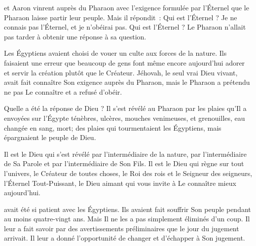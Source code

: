  et Aaron vinrent auprès du Pharaon
 avec l'exigence formulée par l'Éternel que le Pharaon
 laisse partir leur peuple.
 Mais il répondit~: \og Qui est l'Éternel ? Je ne connais pas l'Éternel,
 et je n'obéirai pas. \fg{}
 Qui est l'Éternel ? Le Pharaon n'allait pas tarder
 à obtenir une réponse à sa question.

Les Égyptiens avaient choisi de vouer un culte aux forces de la nature.
 Ils faisaient une erreur que beaucoup de gens font même encore aujourd'hui
 \ocadr{}adorer et servir la création plutôt que le Créateur.
 Jéhovah, le seul vrai Dieu vivant, avait fait connaître Son exigence
 auprès du Pharaon, mais le Pharaon a prétendu
 ne pas Le connaître et a refusé d'obéir.

Quelle a été la réponse de Dieu ? Il s'est révélé au Pharaon
 par les plaies qu'Il a envoyées sur l'Égypte
 \ocadr{}ténèbres, ulcères, mouches venimeuses, et grenouilles,
 eau changée en sang, mort; des plaies qui tourmentaient les Égyptiens,
 mais épargnaient le peuple de Dieu.


Il est le Dieu qui s'est révélé par l'intermédiaire de la nature,
 par l'intermédiaire de Sa Parole et par l'intermédiaire de Son Fils.
 Il est le Dieu qui règne sur tout l'univers, le Créateur de toutes choses,
 le Roi des rois et le Seigneur des seigneurs,
 l'Éternel Tout-Puissant, le Dieu aimant
 qui vous invite à Le connaître mieux aujourd'hui. 

\dvrule






 avait été si patient avec les Égyptiens.
 Ils avaient fait souffrir Son peuple pendant au moins quatre-vingt ans.
 Mais Il ne les a pas simplement éliminés d'un coup.
 Il leur a fait savoir par des avertissements préliminaires
 que le jour du jugement arrivait.
 Il leur a donné l'opportunité de changer et d'échapper à Son jugement.

